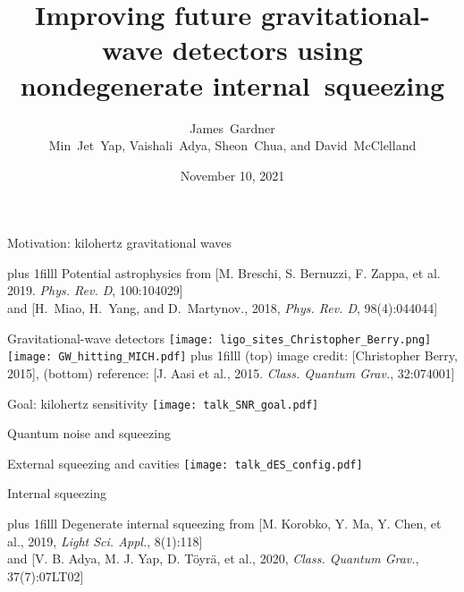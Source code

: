 \documentclass[12pt,xcolor=dvipsnames]{beamer}
\title[]{Improving future gravitational-wave detectors using nondegenerate internal~squeezing}
\author[James Gardner]{\texorpdfstring{\large{James~Gardner}\\\small{Min~Jet~Yap, Vaishali~Adya, Sheon~Chua, and David~McClelland}}{James~Gardner}}
\institute[]{\small The Centre for Gravitational Astrophysics, ANU}
\date{November 10, 2021}
\begin{document}

{
  \begin{frame}[label=titleframe,noframenumbering]
  \titlepage
  \end{frame}
}

\begin{frame}{Motivation: kilohertz gravitational waves}

\vskip0pt plus 1filll
\centering
{\tiny Potential astrophysics from [M. Breschi, S. Bernuzzi, F. Zappa, et al. 2019. \emph{Phys. Rev. D}, 100:104029]}\\
{\vspace{-0.2cm}\tiny and [H.~Miao, H.~Yang, and D.~Martynov., 2018, \emph{Phys. Rev. D}, 98(4):044044]}
\end{frame}

\begin{frame}{Gravitational-wave detectors}
\centering
\texttt{[image: ligo\_sites\_Christopher\_Berry.png]}
\texttt{[image: GW\_hitting\_MICH.pdf]}
\vskip0pt plus 1filll
{\tiny (top) image credit: [Christopher Berry, 2015], (bottom) reference: [J. Aasi et al., 2015. \emph{Class. Quantum Grav.}, 32:074001]}
\end{frame}

\begin{frame}{Goal: kilohertz sensitivity}
\centering
\texttt{[image: talk\_SNR\_goal.pdf]}
\end{frame}

\begin{frame}{Quantum noise and squeezing}

\end{frame}

\begin{frame}{External squeezing and cavities}
\centering
\texttt{[image: talk\_dES\_config.pdf]}
\end{frame}

\begin{frame}{Internal squeezing}


\vskip0pt plus 1filll
\centering
{\tiny Degenerate internal squeezing from [M. Korobko, Y. Ma, Y. Chen, et al., 2019, \emph{Light Sci. Appl.}, 8(1):118]}\\
{\vspace{-0.2cm}\tiny and [V. B. Adya, M. J. Yap, D. Töyrä, et al., 2020, \emph{Class. Quantum Grav.}, 37(7):07LT02]}
\end{frame}
\end{document}

